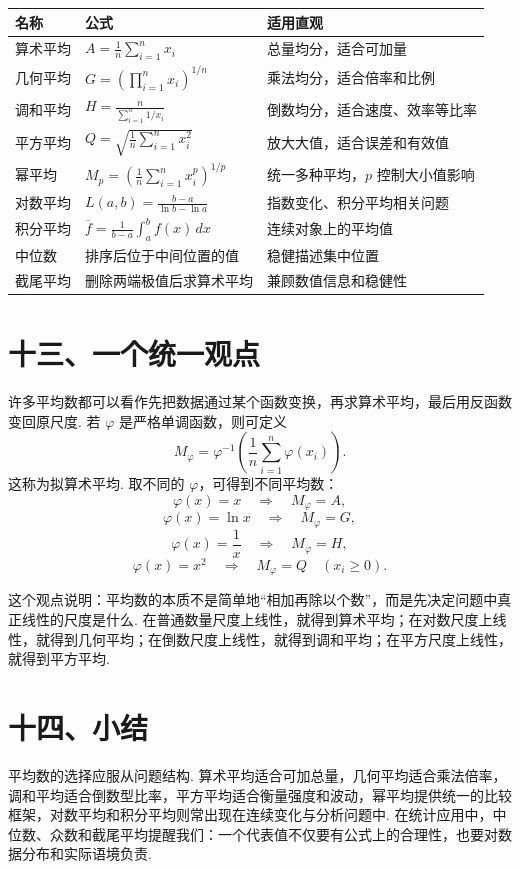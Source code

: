 \documentclass[UTF8, 12pt, fontset=fandol, oneside]{ctexart}
\begin{document}
\begin{center}
\begin{tabularx}{\textwidth}{L{3.1cm}Y Y}
\toprule
名称 & 公式 & 适用直观 \\
\midrule
算术平均 & $\displaystyle A=\frac{1}{n}\sum_{i=1}^n x_i$ & 总量均分，适合可加量 \\
几何平均 & $\displaystyle G=\left(\prod_{i=1}^n x_i\right)^{1/n}$ & 乘法均分，适合倍率和比例 \\
调和平均 & $\displaystyle H=\frac{n}{\sum_{i=1}^n 1/x_i}$ & 倒数均分，适合速度、效率等比率 \\
平方平均 & $\displaystyle Q=\sqrt{\frac{1}{n}\sum_{i=1}^n x_i^2}$ & 放大大值，适合误差和有效值 \\
幂平均 & $\displaystyle M_p=\left(\frac{1}{n}\sum_{i=1}^n x_i^p\right)^{1/p}$ & 统一多种平均，$p$ 控制大小值影响 \\
对数平均 & $\displaystyle L(a,b)=\frac{b-a}{\ln b-\ln a}$ & 指数变化、积分平均相关问题 \\
积分平均 & $\displaystyle \overline{f}=\frac{1}{b-a}\int_a^b f(x)\,dx$ & 连续对象上的平均值 \\
中位数 & 排序后位于中间位置的值 & 稳健描述集中位置 \\
截尾平均 & 删除两端极值后求算术平均 & 兼顾数值信息和稳健性 \\
\bottomrule
\end{tabularx}
\end{center}

\section*{十三、一个统一观点}

许多平均数都可以看作先把数据通过某个函数变换，再求算术平均，最后用反函数变回原尺度. 若 $\varphi$ 是严格单调函数，则可定义
\[
  M_{\varphi}
  =\varphi^{-1}
  \left(
    \frac{1}{n}\sum_{i=1}^n \varphi(x_i)
  \right).
\]
这称为拟算术平均. 取不同的 $\varphi$，可得到不同平均数：
\[
  \varphi(x)=x \quad\Longrightarrow\quad M_{\varphi}=A,
\]
\[
  \varphi(x)=\ln x \quad\Longrightarrow\quad M_{\varphi}=G,
\]
\[
  \varphi(x)=\frac{1}{x} \quad\Longrightarrow\quad M_{\varphi}=H,
\]
\[
  \varphi(x)=x^2 \quad\Longrightarrow\quad M_{\varphi}=Q
  \quad (x_i\ge0).
\]

这个观点说明：平均数的本质不是简单地``相加再除以个数''，而是先决定问题中真正线性的尺度是什么. 在普通数量尺度上线性，就得到算术平均；在对数尺度上线性，就得到几何平均；在倒数尺度上线性，就得到调和平均；在平方尺度上线性，就得到平方平均.

\section*{十四、小结}

平均数的选择应服从问题结构. 算术平均适合可加总量，几何平均适合乘法倍率，调和平均适合倒数型比率，平方平均适合衡量强度和波动，幂平均提供统一的比较框架，对数平均和积分平均则常出现在连续变化与分析问题中. 在统计应用中，中位数、众数和截尾平均提醒我们：一个代表值不仅要有公式上的合理性，也要对数据分布和实际语境负责.
\end{document}
